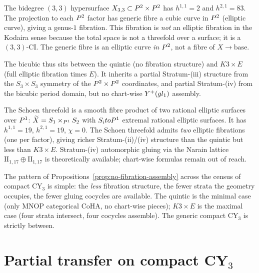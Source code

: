 \begin{example}
\label{ex:bicubic}
The bidegree $(3,3)$ hypersurface $X_{3,3} \subset P^2 \times P^2$
has $h^{1,1} = 2$ and $h^{2,1} = 83$. The projection to each $P^2$
factor has generic fibre a cubic curve in $P^2$ (elliptic curve),
giving a genus-$1$ fibration. This fibration is \emph{not} an elliptic
fibration in the Kodaira sense because the total space is not a
threefold over a surface; it is a $(3,3)$-CI. The generic fibre is
an elliptic curve \emph{in} $P^2$, not a fibre of $X \to \text{base}$.

The bicubic thus sits between the quintic (no fibration structure) and
$K3 \times E$ (full elliptic fibration times $E$). It inherits a
partial Stratum-(iii) structure from the $S_3 \times S_3$ symmetry of
the $P^2 \times P^2$ coordinates, and partial Stratum-(iv) from
the bicubic period domain, but no chart-wise $Y^+(gl_1)$
assembly.
\end{example}

\begin{example}
\label{ex:schoen}
The Schoen threefold is a smooth fibre product of two rational elliptic
surfaces over $P^1$: $\widetilde X = S_1 \times_{P^1} S_2$ with
$S_i to P^1$ extremal rational elliptic surfaces. It has
$h^{1,1} = 19$, $h^{2,1} = 19$, $\chi = 0$. The Schoen threefold
admits \emph{two} elliptic fibrations (one per factor), giving richer
Stratum-(ii)/(iv) structure than the quintic but less than
$K3 \times E$. Stratum-(iv) automorphic gluing via the Narain lattice
$\mathrm{II}_{1,17} \oplus \mathrm{II}_{1,17}$ is theoretically available;
chart-wise formulas remain out of reach.
\end{example}

The pattern of Propositions~\ref{prop:no-fibration-assembly} across the
census of compact CY$_3$ is simple: the \emph{less} fibration structure,
the fewer strata the geometry occupies, the fewer gluing cocycles are
available. The quintic is the minimal case (only MNOP categorical CoHA,
no chart-wise pieces); $K3 \times E$ is the maximal case (four strata
intersect, four cocycles assemble). The generic compact CY$_3$ is
strictly between.

\section{Partial transfer on compact CY$_3$}
\label{sec:partial-transfer}

